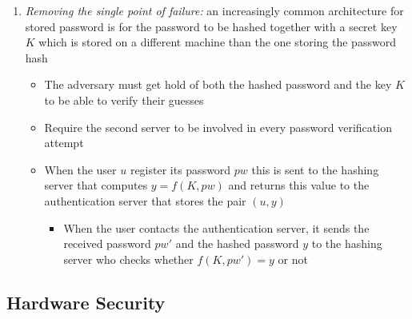 \documentclass[11pt]{article}
\begin{document}
\begin{itemize}
\begin{itemize}
\begin{enumerate}
\begin{itemize}
\end{itemize}
\item \emph{Removing the single point of failure:} an increasingly common architecture for stored password is for the password to be hashed together with a secret key \(K\) which is stored on a different machine than the one storing the password hash
\begin{itemize}
\item The adversary must get hold of both the hashed password and the key \(K\) to be able to verify their guesses
\item Require the second server to be involved in every password verification attempt
\item When the user \(u\) register its password \(pw\) this is sent to the hashing server that computes \(y=f(K,pw)\) and returns this value to the authentication server that stores the pair \((u,y)\)
\begin{itemize}
\item When the user contacts the authentication server, it sends the received password \(pw'\) and the hashed password \(y\) to the hashing server who checks whether \(f(K,pw')=y\) or not
\end{itemize}
\end{itemize}
\end{enumerate}
\end{itemize}
\end{itemize}

\subsection{Hardware Security}
\label{sec:org8149c89}
\end{document}
